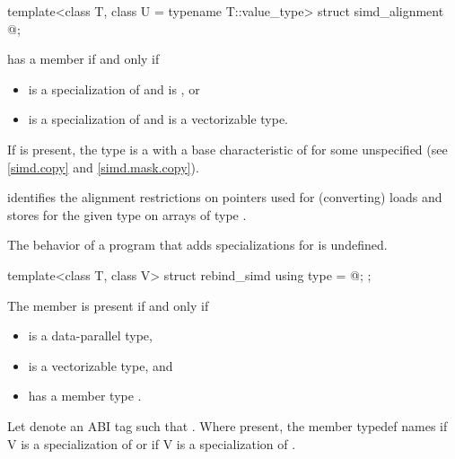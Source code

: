 \begin{itemdecl}
template<class T, class U = typename T::value_type> struct simd_alignment { @\seebelow@ };
\end{itemdecl}

\begin{itemdescr}
\pnum
{} has a member  if and only if
\begin{itemize}
  \item {} is a specialization of  and  is , or
  \item {} is a specialization of  and  is a vectorizable type.
\end{itemize}

\pnum
If  is present, the type  is a  with
a base characteristic of  for some unspecified
 (see \ref{simd.copy} and \ref{simd.mask.copy}). \begin{note} identifies the
alignment restrictions on pointers used for (converting) loads and stores for the given type
 on arrays of type .\end{note}

\pnum
The behavior of a program that adds specializations for  is undefined.
\end{itemdescr}

\begin{itemdecl}
template<class T, class V> struct rebind_simd { using type = @\seebelow@; };
\end{itemdecl}

\begin{itemdescr}
  \pnum
  The member  is present if and only if
  \begin{itemize}
    \item {} is a data-parallel type,
    \item {} is a vectorizable type, and
    \item {} has a member type .
  \end{itemize}

  \pnum
  Let  denote an ABI tag such that .
  Where present, the member typedef  names  if \tcode V is a specialization of  or
   if \tcode V is a specialization of
  .
\end{itemdescr}

